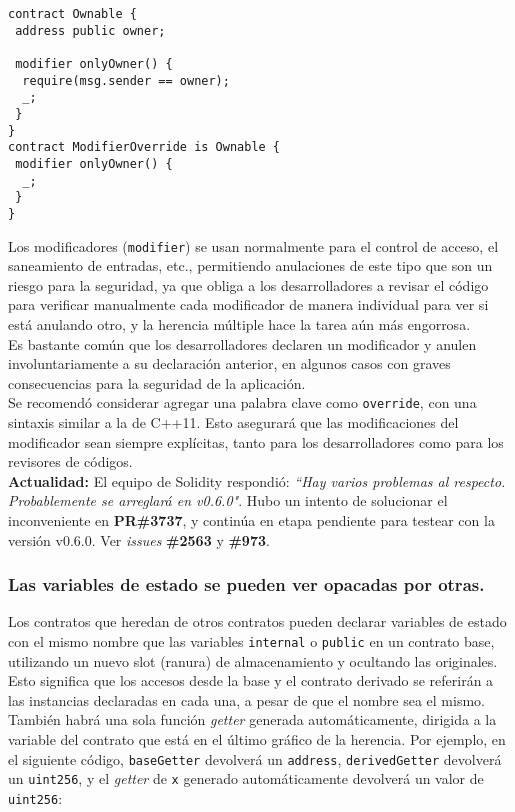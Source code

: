 \begin{lstlisting}[language=Solidity]
contract Ownable {
 address public owner;
  
 modifier onlyOwner() {
  require(msg.sender == owner);
  _;
 }
}
contract ModifierOverride is Ownable { 
 modifier onlyOwner() {
  _;
 }
}
\end{lstlisting}

Los modificadores (\texttt{modifier}) se usan normalmente para el control de acceso, el saneamiento de entradas, etc., permitiendo anulaciones de este tipo que son un riesgo para la seguridad, ya que obliga a los desarrolladores a revisar el código para verificar manualmente cada modificador de manera individual para ver si está anulando otro, y la herencia múltiple hace la tarea aún más engorrosa.\\

Es bastante común que los desarrolladores declaren un modificador y anulen involuntariamente a su declaración anterior, en algunos casos con graves consecuencias para la seguridad de la aplicación.\\

Se recomendó considerar agregar una palabra clave como \texttt{override}, con una sintaxis similar a la de C++11\cite{CppReferenceOverride}. Esto asegurará que las modificaciones del modificador sean siempre explícitas, tanto para los desarrolladores como para los revisores de códigos.\\

\textbf{Actualidad:} El equipo de Solidity respondió: \textit{``Hay varios problemas al respecto. Probablemente se arreglará en v0.6.0"}. Hubo un intento de solucionar el inconveniente en \textbf{PR\#3737}\cite{GHPR3737}, y continúa en etapa pendiente para testear con la versión v0.6.0. Ver \textit{issues} \textbf{\#2563}\cite{GHI2563} y \textbf{\#973}\cite{GHI973}.\\

\subsubsection{Las variables de estado se pueden ver opacadas por otras.}

Los contratos que heredan de otros contratos pueden declarar variables de estado con el mismo nombre que las variables \texttt{internal} o \texttt{public} en un contrato base, utilizando un nuevo slot (ranura) de almacenamiento y ocultando las originales. Esto significa que los accesos desde la base y el contrato derivado se referirán a las instancias declaradas en cada una, a pesar de que el nombre sea el mismo. También habrá una sola función \textit{getter} generada automáticamente, dirigida a la variable del contrato que está en el último gráfico de la herencia. Por ejemplo, en el siguiente código, \texttt{baseGetter} devolverá un \texttt{address}, \texttt{derivedGetter} devolverá un \texttt{uint256}, y el \textit{getter} de \texttt{x} generado automáticamente devolverá un valor de \texttt{uint256}:

